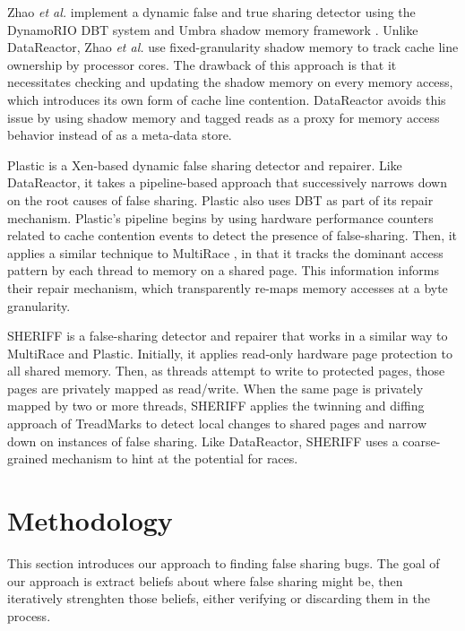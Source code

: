 \documentclass{sig-alternate}
\newcommand{\Toolname}{DataReactor}
\begin{document}

\newcommand{\DrContention}{Zhao \emph{et al.}}

\DrContention{} \cite{DrContention} implement a dynamic false and true sharing detector using the DynamoRIO \cite{DynamoRIO}
DBT system and Umbra shadow memory framework \cite{Umbra}. Unlike \Toolname{}, \DrContention{} use fixed-granularity
shadow memory to track cache line ownership by processor cores. The drawback of this approach is that it necessitates checking
and updating the shadow memory on every memory access, which introduces its own form of cache line contention. \Toolname{}
avoids this issue by using shadow memory and tagged reads as a proxy for memory access behavior instead of as a meta-data store.

Plastic \cite{Plastic} is a Xen-based dynamic false sharing detector and repairer. Like \Toolname{}, it takes a pipeline-based
approach that successively narrows down on the root causes of false sharing. Plastic also uses DBT as part of its
repair mechanism. Plastic's pipeline begins by using hardware performance counters related to cache contention
events to detect the presence of false-sharing. Then, it applies a similar technique to MultiRace \cite{MultiRace}, in
that it tracks the dominant access pattern by each thread to memory on a shared page. This information informs
their repair mechanism, which transparently re-maps memory accesses at a byte granularity.

SHERIFF \cite{SHERIFF} is a false-sharing detector and repairer that works in a similar way to MultiRace and Plastic. Initially,
it applies read-only hardware page protection to all shared memory. Then, as threads attempt to write to protected pages, those
pages are privately mapped as read/write. When the same page is privately mapped by two or more threads, SHERIFF applies
the twinning and diffing approach of TreadMarks \cite{TreadMarks} to detect local changes to shared pages and narrow down
on instances of false sharing. Like \Toolname{}, SHERIFF uses a coarse-grained mechanism to hint at the potential for races.

\section{Methodology}\label{sec:methodology}

This section introduces our approach to finding false sharing bugs. The goal of our approach is extract beliefs about
where false sharing might be, then iteratively strenghten those beliefs, either verifying or discarding them in the process.
\end{document}

